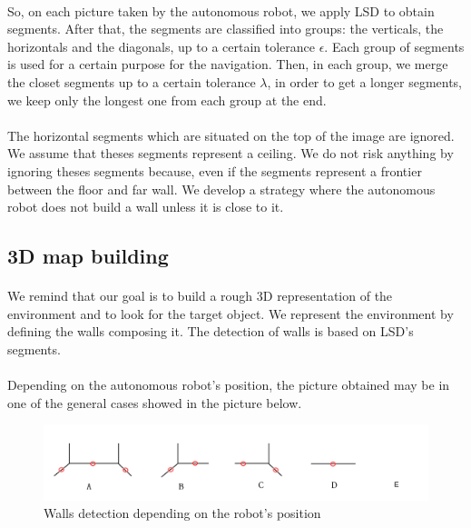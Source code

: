 \documentclass[12pt]{report}
\begin{document}
  \paragraph{}
  So, on each picture taken by the autonomous robot, we apply LSD to obtain segments. After that, the segments are classified into groups: the verticals, the horizontals and the diagonals, up to a certain tolerance $\epsilon$. Each group of segments is used for a certain purpose for the navigation. Then, in each group, we merge the closet segments up to a certain tolerance $\lambda$, in order to get a longer segments, we keep only the longest one from each group at the end. 
  
\paragraph{}
The horizontal segments which are situated on the top of the image are ignored. We assume that theses segments represent a ceiling. We do not risk anything by ignoring theses segments because, even if the segments represent a frontier between the floor and far wall. We develop a strategy where the autonomous robot does not build a wall unless it is close to it.
    \subsection{3D map building}
    
    \paragraph{}
    We remind that our goal is to build a rough 3D representation of the environment and to look for the target object. We represent the environment by defining the walls composing it. The detection of walls is based on LSD's segments.
    
    \paragraph{}
    Depending on the autonomous robot's position, the picture obtained may be in one of the general cases showed in the picture below. 
    
    
    	\begin{figure}[H]
    	\begin{center}
    		\includegraphics[scale=0.65]{res/cases_seg.png}
    		\caption{Walls detection depending on the robot's position}
    	\end{center}
    \end{figure}
\end{document}
